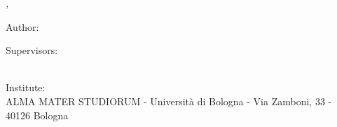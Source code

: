 \hfill
\vfill

\noindent \textit{\myTitle,} {\textcopyright} {\mySubmissionMonth} {\mySubmissionYear}

\bigskip

\noindent Author:\\
{\myFirstName} \textsc{\myLastName}

\medskip

\noindent Supervisors:\\
{\myProfTitle} {\myProfFirstName} \textsc{\myProfLastName}\\
{\myOtherProfTitle} {\myOtherProfFirstName} \textsc{\myOtherProfLastName}

\medskip

\noindent Institute:\\
ALMA MATER STUDIORUM - Università di Bologna - Via Zamboni, 33 - 40126 Bologna 
